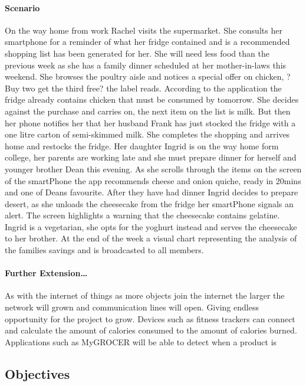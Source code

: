 \documentclass[a4paper, 11pt]{article}
\begin{document}
\paragraph{Scenario}On the way home from work Rachel visits the supermarket. She consults her smartphone for a reminder of what her fridge contained and is a recommended shopping list has been generated for her. She will need less food than the previous week as she has a family dinner scheduled at her mother-in-laws this weekend. She browses the poultry aisle and notices a special offer on chicken, ?Buy two get the third free? the label reads. According to the application the fridge already contains chicken that must be consumed by tomorrow. She decides against the purchase and carries on, the next item on the list is milk. But then her phone notifies her that her husband Frank has just stocked the fridge with a one litre carton of semi-skimmed milk. She completes the shopping and arrives home and restocks the fridge. Her daughter Ingrid is on the way home form college, her parents are working late and she must prepare dinner for herself and younger brother Dean this evening. As she scrolls through the items on the screen of the smartPhone the app recommends cheese and onion quiche, ready in 20mins and one of Deans favourite. After they have had dinner Ingrid decides to prepare desert, as she unloads the cheesecake from the fridge her smartPhone signals an alert. The screen highlights a warning that the cheesecake contains gelatine. Ingrid is a vegetarian, she opts for the yoghurt instead and serves the cheesecake to her brother. At the end of the week a visual chart representing the analysis of the families savings and is broadcasted to all members.

\paragraph{Further Extension\dots} As with the internet of things as more objects join the internet the larger the network will grown and communication lines will open. Giving endless opportunity for the project to grow. Devices such as fitness trackers can connect and calculate the amount of calories consumed to the amount of calories burned. Applications such as MyGROCER will be able to detect when a product is 

\subsection{Objectives}
\end{document}
